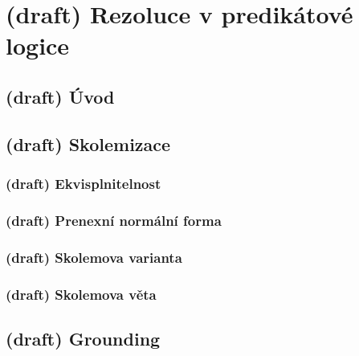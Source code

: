\chapter{(draft) Rezoluce v predikátové logice} 
\label{chapter:predicate-resolution}\todo




\section{(draft) Úvod}\todo




\section{(draft) Skolemizace}\todo



\subsection{(draft) Ekvisplnitelnost}\todo



\subsection{(draft) Prenexní normální forma}\todo



\subsection{(draft) Skolemova varianta}\todo



\subsection{(draft) Skolemova věta}\todo




\section{(draft) Grounding}\todo

